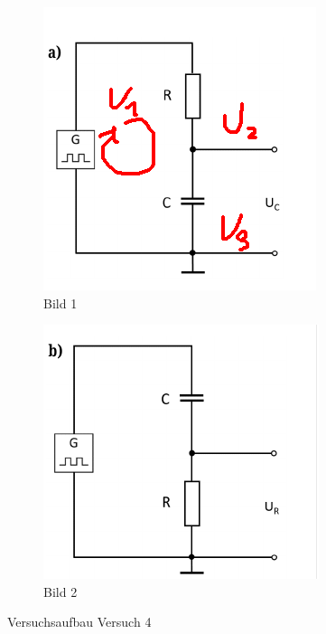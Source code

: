         \begin{figure}[H]
        	\begin{subfigure}{0.48\linewidth}
        		\includegraphics[width=\linewidth]{bilder/versucha.png}
        		\caption{Bild 1}
        		\label{fig:bild1}
        	\end{subfigure}
        	\hfill
        	\begin{subfigure}{0.48\linewidth}
        		\includegraphics[width=\linewidth]{bilder/versuchb.png}
        		\caption{Bild 2}
        		\label{fig:bild2}
        	\end{subfigure}
        	\caption{Versuchsaufbau Versuch 4}
        	\label{fig:zwei-bilder}
        \end{figure}

